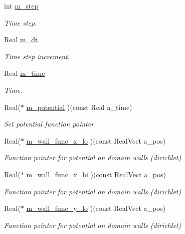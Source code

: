 \begin{DoxyCompactItemize}
int \hyperlink{classpoisson__solver_a4e2d10e5e86970b7dccb274e8caadcb3}{m\+\_\+step}
\begin{DoxyCompactList}\small\item\em Time step. \end{DoxyCompactList}\item 
Real \hyperlink{classpoisson__solver_af34e5aa5b20884df37b580e63e7c4bb3}{m\+\_\+dt}
\begin{DoxyCompactList}\small\item\em Time step increment. \end{DoxyCompactList}\item 
Real \hyperlink{classpoisson__solver_af19d79c7601cacad39200c70aed9dc18}{m\+\_\+time}
\begin{DoxyCompactList}\small\item\em Time. \end{DoxyCompactList}\item 
Real($\ast$ \hyperlink{classpoisson__solver_a9974b3536eabcf42d5182b5d5e6e7aee}{m\+\_\+potential} )(const Real a\+\_\+time)
\begin{DoxyCompactList}\small\item\em Set potential function pointer. \end{DoxyCompactList}\item 
Real($\ast$ \hyperlink{classpoisson__solver_a11b1782a774d292489353f3dfa7ea8dd}{m\+\_\+wall\+\_\+func\+\_\+x\+\_\+lo} )(const Real\+Vect a\+\_\+pos)
\begin{DoxyCompactList}\small\item\em Function pointer for potential on domain walls (dirichlet) \end{DoxyCompactList}\item 
Real($\ast$ \hyperlink{classpoisson__solver_aad7e81c6a8e45636d9df8361b79bb879}{m\+\_\+wall\+\_\+func\+\_\+x\+\_\+hi} )(const Real\+Vect a\+\_\+pos)
\begin{DoxyCompactList}\small\item\em Function pointer for potential on domain walls (dirichlet) \end{DoxyCompactList}\item 
Real($\ast$ \hyperlink{classpoisson__solver_a1e4f53024262b766cc3d0a32d202f49b}{m\+\_\+wall\+\_\+func\+\_\+y\+\_\+lo} )(const Real\+Vect a\+\_\+pos)
\begin{DoxyCompactList}\small\item\em Function pointer for potential on domain walls (dirichlet) \end{DoxyCompactList}\item 

\end{DoxyCompactItemize}
